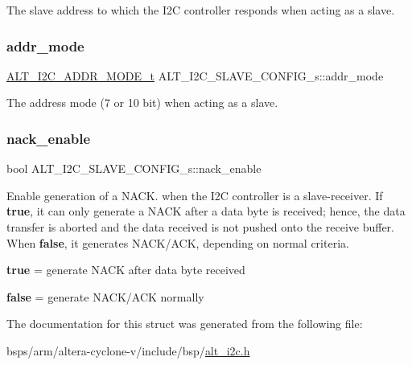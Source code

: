The slave address to which the I2C controller responds when acting as a slave. \mbox{\label{structALT__I2C__SLAVE__CONFIG__s_a4144df0aacaf384eecee950ff8f903a1}} 
\subsubsection{\texorpdfstring{addr\_mode}{addr\_mode}}
{\footnotesize\ttfamily \mbox{\hyperlink{group__ALT__I2C_gacaf56449440abffe69a7941f24f9bf5b}{A\+L\+T\+\_\+\+I2\+C\+\_\+\+A\+D\+D\+R\+\_\+\+M\+O\+D\+E\+\_\+t}} A\+L\+T\+\_\+\+I2\+C\+\_\+\+S\+L\+A\+V\+E\+\_\+\+C\+O\+N\+F\+I\+G\+\_\+s\+::addr\+\_\+mode}

The address mode (7 or 10 bit) when acting as a slave. \mbox{\label{structALT__I2C__SLAVE__CONFIG__s_a297845dd3c03060765e4993dbf96f628}} 
\subsubsection{\texorpdfstring{nack\_enable}{nack\_enable}}
{\footnotesize\ttfamily bool A\+L\+T\+\_\+\+I2\+C\+\_\+\+S\+L\+A\+V\+E\+\_\+\+C\+O\+N\+F\+I\+G\+\_\+s\+::nack\+\_\+enable}

Enable generation of a N\+A\+CK. when the I2C controller is a slave-\/receiver. If {\bfseries{true}}, it can only generate a N\+A\+CK after a data byte is received; hence, the data transfer is aborted and the data received is not pushed onto the receive buffer. When {\bfseries{false}}, it generates N\+A\+C\+K/\+A\+CK, depending on normal criteria.
\begin{DoxyItemize}
\item {\bfseries{true}} = generate N\+A\+CK after data byte received
\item {\bfseries{false}} = generate N\+A\+C\+K/\+A\+CK normally 
\end{DoxyItemize}

The documentation for this struct was generated from the following file\+:\begin{DoxyCompactItemize}
\item 
bsps/arm/altera-\/cyclone-\/v/include/bsp/\mbox{\hyperlink{alt__i2c_8h}{alt\+\_\+i2c.\+h}}\end{DoxyCompactItemize}
